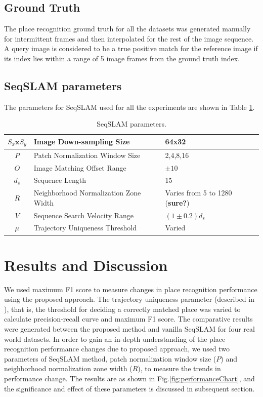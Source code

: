 \documentclass[letterpaper, 10 pt, conference]{ieeeconf}  %
\begin{document}
\subsection{Ground Truth}
The place recognition ground truth for all the datasets was generated manually for intermittent frames and then interpolated for the rest of the image sequence. A query image is considered to be a true positive match for the reference image if its index lies within a range of 5 image frames from the ground truth index.

\subsection{SeqSLAM parameters}
The parameters for SeqSLAM used for all the experiments are shown in Table \ref{table:seqSLAMParams}.

\begin{table}[!h]
	\caption{SeqSLAM parameters.}
	\begin{tabular}{|c|p{4cm}|p{2.5cm}|}
		\hline
		$S_x\mathbf{x}S_y$ & Image Down-sampling Size & 64x32 \\
		\hline
		$P$ & Patch Normalization Window Size & {2,4,8,16} \\
		\hline
		$O$ & Image Matching Offset Range & $\pm10$ \\
		\hline
		$d_s$ & Sequence Length & 15 \\
		\hline
		$R$ & Neighborhood Normalization Zone Width & Varies from 5 to 1280 (\textbf{sure?}) \\
		\hline
		$V$ & Sequence Search Velocity Range & $(1\pm0.2)d_s$ \\
		\hline
		$\mu$ & Trajectory Uniqueness Threshold & Varied \\
		\hline
	\end{tabular}
	\label{table:seqSLAMParams}
\end{table}

\section{Results and Discussion}
We used maximum F1 score to measure changes in place recognition performance using the proposed approach. The trajectory uniqueness parameter (described in \cite{Milford2012}), that is, the threshold for deciding a correctly matched place was varied to calculate precision-recall curve and maximum F1 score. The comparative results were generated between the proposed method and vanilla SeqSLAM for four real world datasets. In order to gain an in-depth understanding of the place recognition performance changes due to proposed approach, we used two parameters of SeqSLAM method, patch normalization window size ($P$) and neighborhood normalization zone width ($R$), to measure the trends in performance change. The results are as shown in Fig.\ref{fig:performanceChart}, and the significance and effect of these parameters is discussed in subsequent section. 
\end{document}
